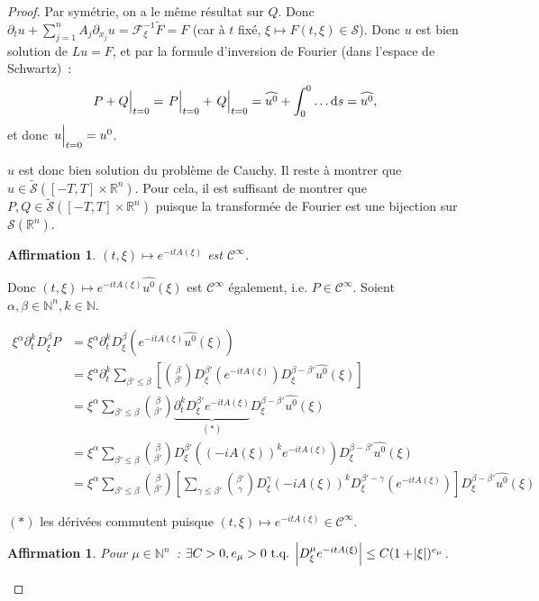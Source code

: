 \documentclass{report}
\newcommand{\R}{{\mathbb R}}
\newcommand{\N}{{\mathbb N}}
\newcommand{\tq}{\text{ t.q. }}
\newcommand{\st}{\tq}
\newcommand{\restr}[2]{\left.#1\vphantom{\big|}\right|_{#2}}
\newtheorem{claim}[thm]{Affirmation}
\theoremstyle{definition}
\theoremstyle{remark}
\begin{document}
\begin{proof}
Par symétrie, on a le même résultat sur $Q$. Donc $\partial_t u + \sum_{j=1}^nA_j\partial_{x_j}u = \mathcal F_\xi^{-1}\widetilde F = F$
(car à $t$ fixé, $\xi \mapsto F(t, \xi) \in \mathcal S$). Donc $u$ est bien solution de $Lu = F$, et par la formule d'inversion de Fourier (dans l'espace de Schwartz)~:
\[\restr {P+Q}{t=0} = \restr P{t=0} + \restr Q{t=0} = \widehat {u^0} + \int_0^0\ldots\dif s = \widehat {u^0},\]
et donc $\restr u{t=0} = u^0$.

$u$ est donc bien solution du problème de Cauchy. Il reste à montrer que $u \in \widetilde {\mathcal S}([-T, T] \times \R^n)$. Pour cela, il est suffisant de montrer que
$P, Q \in \widetilde {\mathcal S}([-T, T] \times \R^n)$ puisque la transformée de Fourier est une bijection sur $\mathcal S(\R^n)$.

\begin{claim}\label{claim 2} $(t, \xi) \mapsto e^{-itA(\xi)}$ est $\mathcal C^\infty$.
\end{claim}

Donc $(t, \xi) \mapsto e^{-itA(\xi)}\widehat {u^0}(\xi)$ est $\mathcal C^\infty$ également, i.e. $P \in \mathcal C^\infty$.
Soient $\alpha, \beta \in \N^n, k \in \N$.

\begin{align*}
	\xi^\alpha\partial_t^kD_\xi^\beta P
	&= \xi^\alpha\partial_t^kD_\xi^\beta\left(e^{-itA(\xi)}\widehat {u^0}(\xi)\right) \\
	&= \xi^\alpha\partial_t^k\sum_{\beta'\leq\beta}\left[\binom \beta{\beta'}D_\xi^{\beta'}(e^{-itA(\xi)})D_\xi^{\beta-\beta'}\widehat {u^0}(\xi)\right] \\
	&= \xi^\alpha\sum_{\beta'\leq\beta}\binom\beta{\beta'}\underbrace {\partial_t^kD_\xi^{\beta'}e^{-itA(\xi)}}_{(*)}D_\xi^{\beta-\beta'}\widehat {u^0}(\xi) \\
	&= \xi^\alpha\sum_{\beta'\leq\beta}\binom\beta{\beta'}D_\xi^{\beta'}\left(\left(-iA(\xi)\right)^ke^{-itA(\xi)}\right)D_\xi^{\beta-\beta'}\widehat {u^0}(\xi) \\
	&= \xi^\alpha\sum_{\beta'\leq\beta}\binom \beta{\beta'}\left[\sum_{\gamma\leq\beta'}\binom{\beta'}\gamma D_\xi^\gamma\left(-iA(\xi)\right)^kD_\xi^{\beta'-\gamma}\left(e^{-itA(\xi)}\right)\right]D_\xi^{\beta-\beta'}\widehat{u^0}(\xi)
\end{align*}

{\tiny {$(*)$ les dérivées commutent puisque $(t, \xi) \mapsto e^{-itA(\xi)} \in \mathcal C^\infty$.}}

\begin{claim}\label{claim 3} Pour $\mu \in \N^n$~: $\exists C > 0, e_\mu > 0 \st \abs {D_\xi^\mu e^{-itA(\xi)}} \leq C(1+\abs\xi)^{e_\mu}$.
\end{claim}


\end{proof}
\end{document}
